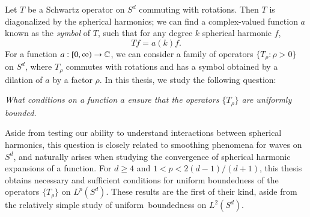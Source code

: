 
Let $T$ be a Schwartz operator on $S^d$ commuting with rotations. Then $T$ is diagonalized by the spherical harmonics; we can find a complex-valued function $a$ known as the \emph{symbol} of $T$, such that for any degree $k$ spherical harmonic $f$,
%
\[ Tf = a(k) f. \]
%
For a function $a: [0,\infty) \to \operatorname{\mathbb{C}}$, we can consider a family of operators $\{ T_\rho : \rho > 0 \}$ on $S^d$, where $T_\rho$ commutes with rotations and has a symbol obtained by a dilation of $a$ by a factor $\rho$. In this thesis, we study the following question:  
%
\begin{changemargin}{3cm}{3cm}
\begin{center}
  \emph{What conditions on a function $a$ ensure that the operators $\{ T_\rho \}$ are uniformly bounded.}
\end{center}
\end{changemargin}
%
Aside from testing our ability to understand interactions between spherical harmonics, this question is closely related to smoothing phenomena for waves on $S^d$, and naturally arises when studying the convergence of spherical harmonic expansions of a function. For $d \geq 4$ and $1 < p < 2(d-1)/(d+1)$, this thesis obtains necessary and sufficient conditions for uniform boundedness of the operators $\{ T_\rho \}$ on $L^p(S^d)$. These results are the first of their kind, aside from the relatively simple study of uniform\ boundedness on $L^2(S^d)$.


%



